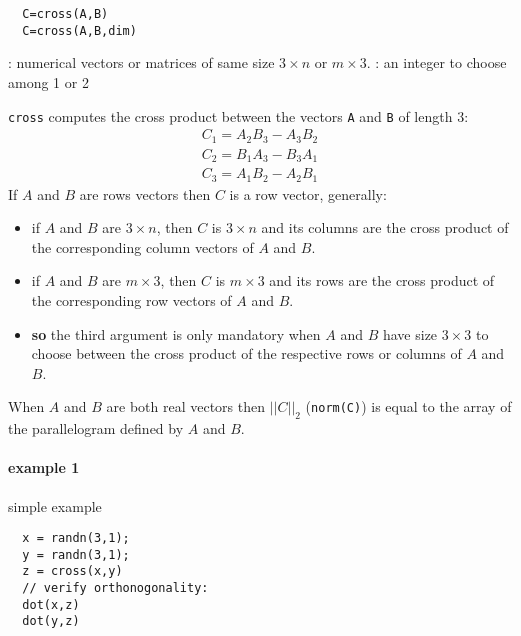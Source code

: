 \begin{mandesc}
\end{mandesc}
\begin{calling_sequence}
\begin{verbatim}
  C=cross(A,B)  
  C=cross(A,B,dim)  
\end{verbatim}
\end{calling_sequence}
\begin{parameters}
  \begin{varlist}
    : numerical vectors or matrices of same size $3 \times n$ or $m \times 3$. 
    : an integer to choose among 1 or 2
  \end{varlist}
\end{parameters}
\begin{mandescription}
  \verb+cross+ computes the cross product between the vectors \verb+A+ and \verb+B+ of length 3:
$$
\begin{array}{l}
     C_1 = A_2 B_3 - A_3 B_2 \\
     C_2 = B_1 A_3 - B_3 A_1 \\
     C_3 = A_1 B_2 - A_2 B_1
\end{array}
$$
 If  $A$ and $B$ are rows vectors then $C$ is a row vector, generally:
 \begin{itemize}
 \item if $A$ and $B$ are $3 \times n$, then $C$ is $3 \times n$ and its columns are the 
 cross product  of the corresponding column vectors of  $A$ and $B$.
 \item if $A$ and $B$ are $m \times 3$, then $C$ is $m \times 3$ and its rows are the 
 cross product  of the corresponding row vectors of  $A$ and $B$.
 \item {\bf so} the third argument is only mandatory when  $A$ and $B$ have size $3 \times 3$
 to choose between the cross product of the respective rows or columns of $A$ and $B$.
\end{itemize}
When $A$ and $B$ are both real vectors then $|| C ||_2$ (\verb+norm(C)+) is equal to the 
array of the parallelogram defined by $A$ and $B$.   
\end{mandescription}

\begin{examples}
\paragraph{example 1} simple example
\begin{Verbatim}
  x = randn(3,1);
  y = randn(3,1);
  z = cross(x,y)
  // verify orthonogonality:
  dot(x,z)
  dot(y,z)
\end{Verbatim}
\end{examples}

\begin{manseealso}
\end{manseealso}

